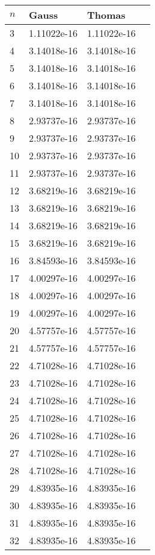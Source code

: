 \documentclass{article}
\begin{document}
\begin{table}[H]
\parbox{.45\linewidth}{
\begin{tabular}{|l|l|l|l|}
\hline
$n$ & Gauss & Thomas \\ \hline
3 & 1.11022e-16 & 1.11022e-16 \\ \hline
4 & 3.14018e-16 & 3.14018e-16 \\ \hline
5 & 3.14018e-16 & 3.14018e-16 \\ \hline
6 & 3.14018e-16 & 3.14018e-16 \\ \hline
7 & 3.14018e-16 & 3.14018e-16 \\ \hline
8 & 2.93737e-16 & 2.93737e-16 \\ \hline
9 & 2.93737e-16 & 2.93737e-16 \\ \hline
10 & 2.93737e-16 & 2.93737e-16 \\ \hline
11 & 2.93737e-16 & 2.93737e-16 \\ \hline
12 & 3.68219e-16 & 3.68219e-16 \\ \hline
13 & 3.68219e-16 & 3.68219e-16 \\ \hline
14 & 3.68219e-16 & 3.68219e-16 \\ \hline
15 & 3.68219e-16 & 3.68219e-16 \\ \hline
16 & 3.84593e-16 & 3.84593e-16 \\ \hline
17 & 4.00297e-16 & 4.00297e-16 \\ \hline
18 & 4.00297e-16 & 4.00297e-16 \\ \hline
19 & 4.00297e-16 & 4.00297e-16 \\ \hline
20 & 4.57757e-16 & 4.57757e-16 \\ \hline
21 & 4.57757e-16 & 4.57757e-16 \\ \hline
22 & 4.71028e-16 & 4.71028e-16 \\ \hline
23 & 4.71028e-16 & 4.71028e-16 \\ \hline
24 & 4.71028e-16 & 4.71028e-16 \\ \hline
25 & 4.71028e-16 & 4.71028e-16 \\ \hline
26 & 4.71028e-16 & 4.71028e-16 \\ \hline
27 & 4.71028e-16 & 4.71028e-16 \\ \hline
28 & 4.71028e-16 & 4.71028e-16 \\ \hline
29 & 4.83935e-16 & 4.83935e-16 \\ \hline
30 & 4.83935e-16 & 4.83935e-16 \\ \hline
31 & 4.83935e-16 & 4.83935e-16 \\ \hline
32 & 4.83935e-16 & 4.83935e-16 \\ \hline

\end{tabular}}
\end{table}
\end{document}
